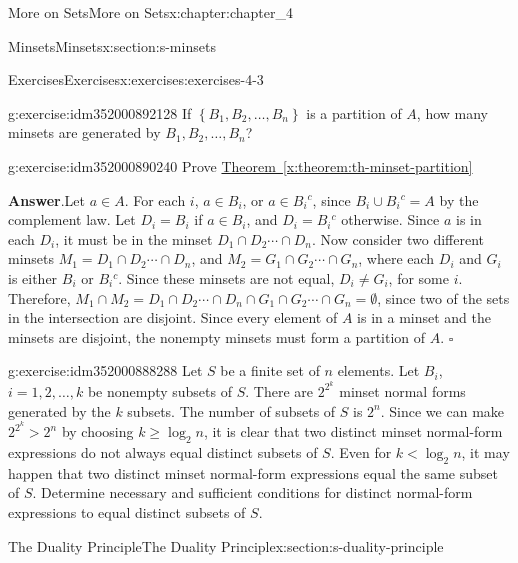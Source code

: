 \documentclass[oneside,10pt,]{book}
\newcommand{\blocktitlefont}{\relax}
\newcommand{\xreffont}{\relax}
\begin{document}
\begin{chapterptx}{More on Sets}{}{More on Sets}{}{}{x:chapter:chapter_4}
\begin{sectionptx}{Minsets}{}{Minsets}{}{}{x:section:s-minsets}
\begin{exercises-subsection}{Exercises}{}{Exercises}{}{}{x:exercises:exercises-4-3}
\begin{divisionexercise}{6}{}{}{g:exercise:idm352000892128}
If \(\left\{B_1, B_2, \ldots , B_n\right\}\) is a partition of \(A\), how many minsets are generated by \(B_1, B_2, \ldots , B_n\)?%
\end{divisionexercise}%
\begin{divisionexercise}{7}{}{}{g:exercise:idm352000890240}%
Prove \hyperref[x:theorem:th-minset-partition]{Theorem~{\xreffont\ref{x:theorem:th-minset-partition}}}%
\par\smallskip%
\noindent\textbf{\blocktitlefont Answer}.\hypertarget{g:answer:idm352000889040}{}\quad{}Let \(a\in A\). For each \(i\), \(a\in B_i\), or \(a\in B_i{}^c\), since \(B_i\cup B_i{}^c=A\) by the complement law. Let \(D_i=B_i\) if \(a\in B_i\), and \(D_i=B_i{}^c\) otherwise. Since \(a\) is in each \(D_i\), it must be in the minset \(D_1\cap  D_2 \cdots \cap D_n\). Now consider two different minsets \(M_1= D_1\cap D_2\cdots \cap D_n\), and \(M_2=G_1\cap G_2\cdots \cap G_n\), where each \(D_i\) and \(G_i\) is either \(B_i\) or \(B_i{}^c\). Since these minsets are not equal, \(D_i\neq G_i\), for some \(i\). Therefore, \(M_1\cap M_2=D_1\cap  D_2 \cdots \cap D_n\cap G_1\cap G_2\cdots \cap G_n=\emptyset\), since two of the sets in the intersection are disjoint. Since every element of \(A\) is in a minset and the minsets are disjoint, the nonempty minsets must form a partition of \(A\). \(\square\)%
\end{divisionexercise}%
\begin{divisionexercise}{8}{}{}{g:exercise:idm352000888288}%
Let \(S\) be a finite set of \(n\) elements. Let \(B_i\), \(i = 1, 2, \ldots , k\) be nonempty subsets of \(S\). There are \(2^{2^k}\) minset normal forms generated by the \(k\) subsets. The number of subsets of \(S\) is \(2^n\). Since we can make \(2^{2^k} > 2^n\) by choosing \(k \geq  \log _2 n\), it is clear that two distinct minset normal-form expressions do not always equal distinct subsets of \(S\). Even for \(k < \log _2 n\), it may happen that two distinct minset normal-form expressions equal the same subset of \(S\). Determine necessary and sufficient conditions for distinct normal-form expressions to equal distinct subsets of \(S\).%
\end{divisionexercise}%
\end{exercises-subsection}
\end{sectionptx}
%
%
\typeout{************************************************}
\typeout{************************************************}
%
\begin{sectionptx}{The Duality Principle}{}{The Duality Principle}{}{}{x:section:s-duality-principle}

\end{sectionptx}
\end{chapterptx}
\end{document}
